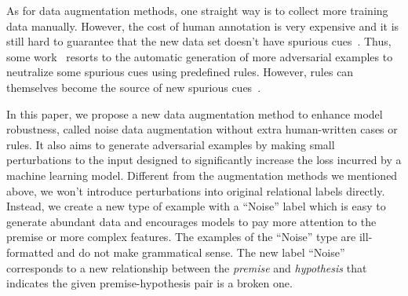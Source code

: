 As for data augmentation methods, one straight way is to collect more training 
data manually. 
However, the cost of human annotation is very expensive and it is still hard 
to guarantee 
that the new data set doesn't have spurious cues~\cite{williams2018broad}.
Thus, some work~\cite{mccoy2019right,min2020syntactic,wang2019if} resorts to the 
automatic generation of 
more adversarial examples to neutralize some spurious cues using predefined rules. 
However, rules can themselves become the source of new spurious cues~\cite{jia2017adversarial,ribeiro2018semantically,iyyer2018adversarial,liu2019inoculation}.

In this paper, we propose a new data augmentation method
to enhance model robustness, called noise data augmentation without extra human-written cases or rules. 
It also aims to generate adversarial examples by making small 
perturbations to the input designed to significantly increase 
the loss incurred by a machine learning model. Different from the 
augmentation methods we mentioned above, we won't introduce 
perturbations into original relational labels directly. Instead, we create 
a new type of example with a ``Noise'' label which is easy to generate
abundant data and encourages models to pay more attention
to the premise or more complex features.
The examples of the ``Noise'' type are ill-formatted and do not make
grammatical sense. The new label ``Noise'' corresponds to a 
new relationship between the \textit{premise} and \textit{hypothesis} 
that indicates the given premise-hypothesis pair is a broken one.

